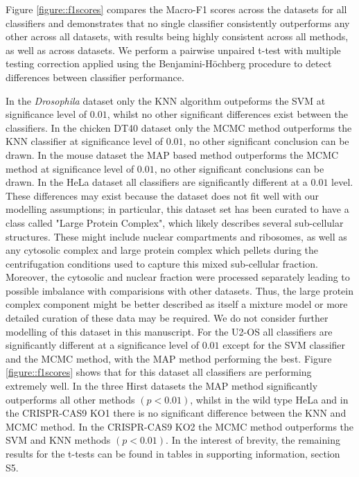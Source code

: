 \documentclass[10pt,letterpaper]{article}\usepackage[]{graphicx}\usepackage[]{color}
\begin{document}
Figure \ref{figure::f1scores} compares the Macro-F1 scores across the
datasets for all classifiers and demonstrates that no single
classifier consistently outperforms any other across all datasets,
with results being highly consistent across all methods, as well as
across datasets. We perform a pairwise unpaired t-test with multiple
testing correction applied using the Benjamini-H\"ochberg procedure
\cite{FDR:1995} to detect differences between classifier performance.

In the \textit{Drosophila} dataset only the KNN algorithm outpeforms
the SVM at significance level of $0.01$, whilst no other significant
differences exist between the classifiers. In the chicken DT40 dataset
only the MCMC method outperforms the KNN classifier at significance
level of $0.01$, no other significant conclusion can be drawn. In the
mouse dataset the MAP based method outperforms the MCMC method at
significance level of $0.01$, no other significant conclusions can be
drawn. In the HeLa dataset all classifiers are significantly different
at a $0.01$ level. These differences may exist because the dataset does
not fit well with our modelling assumptions; in particular, this
dataset set has been curated to have a class called "Large Protein
Complex", which likely describes several sub-cellular
structures. These might include nuclear compartments and ribosomes, as
well as any cytosolic complex and large protein complex which pellets
during the centrifugation conditions used to capture this mixed
sub-cellular fraction. Moreover, the cytosolic and nuclear fraction
were processed separately leading to possible imbalance with
comparisions with other datasets. Thus, the large protein complex
component might be better described as itself a mixture model or more
detailed curation of these data may be required. We do not consider
further modelling of this dataset in this manuscript. For the U2-OS
all classifiers are significantly different at a significance level of
$0.01$ except for the SVM classifier and the MCMC method, with the MAP
method performing the best. Figure \ref{figure::f1scores} shows that
for this dataset all classifiers are performing extremely well. In the
three Hirst datasets the MAP method significantly outperforms all
other methods $(p < 0.01)$, whilst in the wild type HeLa and in the
CRISPR-CAS9 KO1 there is no significant difference between the KNN
and MCMC method. In the CRISPR-CAS9 KO2 the MCMC method outperforms
the SVM and KNN methods $(p < 0.01)$. In the interest of brevity, the
remaining results for the t-tests can be found in tables in supporting information, section S5.
\end{document}
